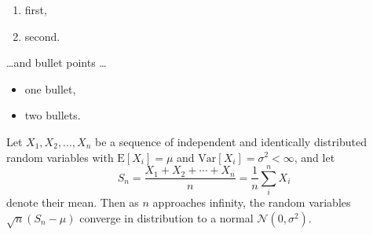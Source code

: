 \begin{enumerate}
\item first,
\item second.
\end{enumerate}
\dots and bullet points \dots
\begin{itemize}
\item one bullet,
\item two bullets.
\end{itemize}

Let $X_1, X_2, \ldots, X_n$ be a sequence of independent and identically distributed random variables with $\text{E}[X_i] = \mu$ and $\text{Var}[X_i] = \sigma^2 < \infty$, and let
\[S_n = \frac{X_1 + X_2 + \cdots + X_n}{n}
      = \frac{1}{n}\sum_{i}^{n} X_i\]
denote their mean. Then as $n$ approaches infinity, the random variables $\sqrt{n}(S_n - \mu)$ converge in distribution to a normal $\mathcal{N}(0, \sigma^2)$.

\begin{quote}
    \lipsum[10]
\end{quote}